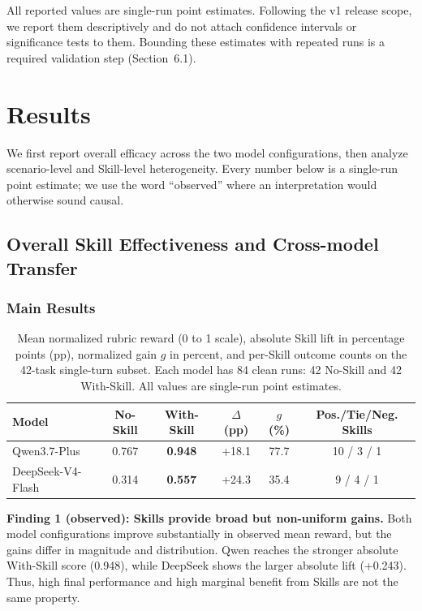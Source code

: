 \documentclass[10pt]{article}
\begin{document}
All reported values are single-run point estimates. Following the v1 release scope, we report them descriptively and do not attach confidence intervals or significance tests to them. Bounding these estimates with repeated runs is a required validation step (Section~6.1).

\section{Results}

We first report overall efficacy across the two model configurations, then analyze scenario-level and Skill-level heterogeneity. Every number below is a single-run point estimate; we use the word ``observed'' where an interpretation would otherwise sound causal.

\subsection{Overall Skill Effectiveness and Cross-model Transfer}

\subsubsection{Main Results}

\begin{table}[H]
\centering
\caption{Mean normalized rubric reward (0 to 1 scale), absolute Skill lift in percentage points (pp), normalized gain $g$ in percent, and per-Skill outcome counts on the 42-task single-turn subset. Each model has 84 clean runs: 42 No-Skill and 42 With-Skill. All values are single-run point estimates.}
\label{tab:mainresults}
\begin{tabular}{lccccc}
\toprule
Model & No-Skill & With-Skill & $\Delta$ (pp) & $g$ (\%) & Pos./Tie/Neg. Skills \\
\midrule
Qwen3.7-Plus & 0.767 & \textbf{0.948} & +18.1 & 77.7 & 10 / 3 / 1 \\
DeepSeek-V4-Flash & 0.314 & \textbf{0.557} & +24.3 & 35.4 & 9 / 4 / 1 \\
\bottomrule
\end{tabular}
\end{table}

\textbf{Finding 1 (observed): Skills provide broad but non-uniform gains.}
Both model configurations improve substantially in observed mean reward, but the gains differ in magnitude and distribution. Qwen reaches the stronger absolute With-Skill score (0.948), while DeepSeek shows the larger absolute lift (+0.243). Thus, high final performance and high marginal benefit from Skills are not the same property.
\end{document}
